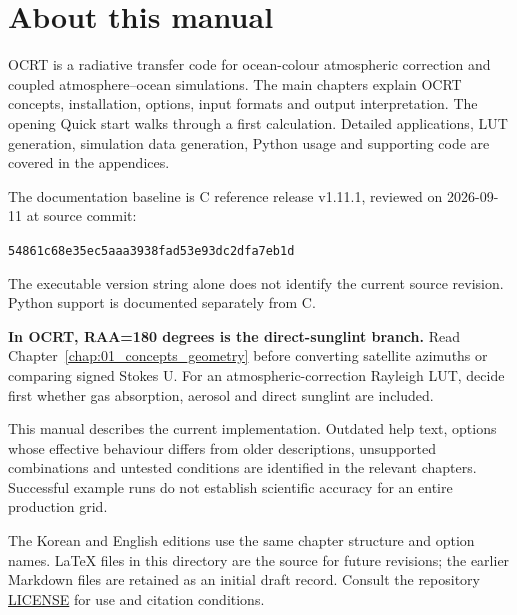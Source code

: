 \documentclass[11pt,a4paper,oneside]{report}
\begin{document}
\chapter*{About this manual}
OCRT is a radiative transfer code for ocean-colour atmospheric correction and coupled atmosphere--ocean simulations. The main chapters explain OCRT concepts, installation, options, input formats and output interpretation. The opening Quick start walks through a first calculation. Detailed applications, LUT generation, simulation data generation, Python usage and supporting code are covered in the appendices.

The documentation baseline is C reference release v1.11.1, reviewed on 2026-09-11 at source commit:

\texttt{54861c68e35ec5aaa3938fad53e93dc2dfa7eb1d}

The executable version string alone does not identify the current source revision. Python support is documented separately from C.

\textbf{In OCRT, RAA=180 degrees is the direct-sunglint branch.} Read Chapter~\ref{chap:01_concepts_geometry} before converting satellite azimuths or comparing signed Stokes U. For an atmospheric-correction Rayleigh LUT, decide first whether gas absorption, aerosol and direct sunglint are included.

This manual describes the current implementation. Outdated help text, options whose effective behaviour differs from older descriptions, unsupported combinations and untested conditions are identified in the relevant chapters. Successful example runs do not establish scientific accuracy for an entire production grid.

The Korean and English editions use the same chapter structure and option names. LaTeX files in this directory are the source for future revisions; the earlier Markdown files are retained as an initial draft record. Consult the repository \href{https://github.com/brtnt/OCRT/blob/main/LICENSE}{LICENSE} for use and citation conditions.
\tableofcontents
\clearpage

\clearpage{}






\appendix





\end{document}
